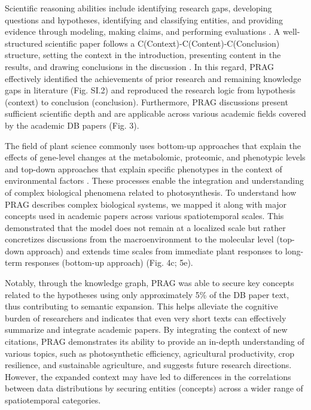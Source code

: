 \documentclass[12pt]{article}
\begin{document}
Scientific reasoning abilities include identifying research gaps, developing questions and hypotheses, identifying and classifying entities, and providing evidence through modeling, making claims, and performing evaluations \cite{ref24, ref25, ref26}. A well-structured scientific paper follows a C(Context)-C(Content)-C(Conclusion) structure, setting the context in the introduction, presenting content in the results, and drawing conclusions in the discussion \cite{ref27, ref28}. In this regard, PRAG effectively identified the achievements of prior research and remaining knowledge gaps in literature (Fig. SI.2) and reproduced the research logic from hypothesis (context) to conclusion (conclusion). Furthermore, PRAG discussions present sufficient scientific depth and are applicable across various academic fields covered by the academic DB papers (Fig. 3).

The field of plant science commonly uses bottom-up approaches that explain the effects of gene-level changes at the metabolomic, proteomic, and phenotypic levels and top-down approaches that explain specific phenotypes in the context of environmental factors \cite{ref26}. These processes enable the integration and understanding of complex biological phenomena related to photosynthesis. To understand how PRAG describes complex biological systems, we mapped it along with major concepts used in academic papers across various spatiotemporal scales. This demonstrated that the model does not remain at a localized scale but rather concretizes discussions from the macroenvironment to the molecular level (top-down approach) and extends time scales from immediate plant responses to long-term responses (bottom-up approach) (Fig. 4c; 5e).

Notably, through the knowledge graph, PRAG was able to secure key concepts related to the hypotheses using only approximately 5\% of the DB paper text, thus contributing to semantic expansion. This helps alleviate the cognitive burden of researchers and indicates that even very short texts can effectively summarize and integrate academic papers. By integrating the context of new citations, PRAG demonstrates its ability to provide an in-depth understanding of various topics, such as photosynthetic efficiency, agricultural productivity, crop resilience, and sustainable agriculture, and suggests future research directions. However, the expanded context may have led to differences in the correlations between data distributions by securing entities (concepts) across a wider range of spatiotemporal categories.
\end{document}

